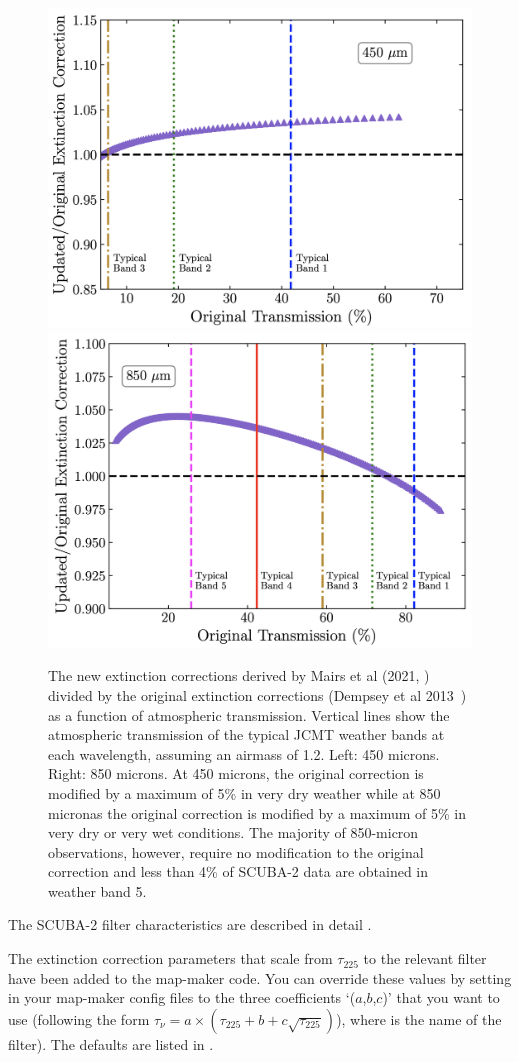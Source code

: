 \begin{figure}
\begin{center}
\includegraphics[width=0.4\linewidth]{sc21-NewExtCor-450} \hspace{0.02\linewidth}
\includegraphics[width=0.4\linewidth]{sc21-NewExtCor-850}
\caption[Updated Extinction Corrections]{The new extinction corrections 
derived by Mairs et al (2021, \cite{mairs21}) divided by the original extinction corrections (Dempsey et al 2013~\cite{dempsey12}) 
as a function of atmospheric transmission. Vertical lines show the atmospheric transmission of the typical JCMT 
weather bands at each wavelength, assuming an airmass of 1.2. Left: 450 microns. Right: 850 microns. At 450 microns, 
the original correction is modified by a maximum of 5\% in very dry weather while at 850 micronas the original correction is 
modified by a maximum of 5\% in very dry or very wet conditions. The
majority of 850-micron observations, however, require no modification
to the original correction and less than 4\% of SCUBA-2 data are obtained in weather band 5. \label{fig:NewExtCor}}
\end{center}
\end{figure}


The SCUBA-2 filter characteristics are described in detail
.

The extinction correction parameters that scale from $\tau_{225}$ to
the relevant filter have been added to the map-maker code. You can
override these values by setting  in
your map-maker config files to the three coefficients `($a$,$b$,$c$)' that
you want to use (following the form $\tau_{\nu} = a \times (\tau_{225} + b + c\sqrt{\tau_{225}})$), where  is the name of the
filter). The defaults are listed in
.



